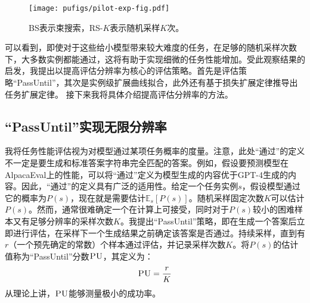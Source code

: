 \begin{figure}[htbp]
\centering
    \texttt{[image: pufigs/pilot-exp-fig.pdf]}
    \caption{BS表示束搜索，RS-$K$表示随机采样$K$次。}
    \label{tab:opensourcemodel_rs}
\end{figure}

可以看到，即使对于这些给小模型带来较大难度的任务，在足够的随机采样次数下，大多数实例都能通过，这将有助于实现细微的任务性能增加。受此观察结果的启发，我提出以提高评估分辨率为核心的评估策略。首先是评估策略“PassUntil”，其次是实例级扩展曲线拟合，此外还有基于损失扩展定律推导出任务扩展定律。 接下来我将具体介绍提高评估分辨率的方法。

\subsection{“PassUntil”实现无限分辨率}
我将任务性能评估视为对模型通过某项任务概率的度量。注意，此处“通过”的定义不一定是要生成和标准答案字符串完全匹配的答案。例如，假设要预测模型在AlpacaEval\citep{alpaca_eval}上的性能，可以将“通过”定义为模型生成的内容优于GPT-4生成的内容。因此，“通过”的定义具有广泛的适用性。给定一个任务实例$s$，假设模型通过它的概率为$P(s)$，现在就是需要估计$\mathbb{E}_s[P(s)]$。随机采样固定次数$K$可以估计$P(s)$。然而，通常很难确定一个在计算上可接受，同时对于$P(s)$较小的困难样本又有足够分辨率的采样次数$K$。我提出“PassUntil”策略，即在生成一个答案后立即进行评估，在采样下一个生成结果之前确定该答案是否通过。持续采样，直到有$r$（一个预先确定的常数）个样本通过评估，并记录采样次数$K$。将$P(s)$的估计值称为“PassUntil”分数$\textsc{PU}$，其定义为：
\begin{equation}
\label{equ:pudef}
    \textsc{PU} = \frac{r}{K}
\end{equation}
从理论上讲，$\textsc{PU}$能够测量极小的成功率。


